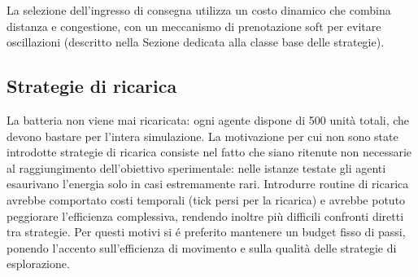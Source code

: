 La selezione dell'ingresso di consegna utilizza un costo dinamico che combina distanza e
congestione, con un meccanismo di prenotazione soft per evitare oscillazioni
(descritto nella Sezione dedicata alla classe base delle strategie).

\subsection{Strategie di ricarica}
La batteria non viene mai ricaricata: ogni agente dispone di 500 unit\`a totali,
che devono bastare per l'intera simulazione. La motivazione per cui non sono state 
introdotte strategie di ricarica consiste nel fatto che siano ritenute non necessarie
al raggiungimento dell'obiettivo sperimentale: nelle istanze testate gli agenti
esaurivano l'energia solo in casi estremamente rari. Introdurre routine di
ricarica avrebbe comportato costi temporali (tick persi per la ricarica) 
e avrebbe potuto peggiorare l'efficienza
complessiva, rendendo inoltre pi\`u difficili confronti diretti tra strategie.
Per questi motivi si \'e preferito mantenere un budget fisso di passi, ponendo
l'accento sull'efficienza di movimento e sulla qualit\`a delle strategie di
esplorazione.